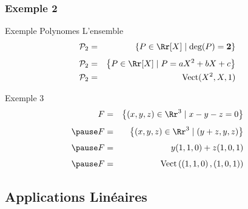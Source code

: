 \documentclass[dvipsnames]{beamer}
\begin{document}
\begin{frame}[<+->]
  \frametitle{Exemple 2}
  \begin{block}{Exemple Polynomes}
    \small
  L'ensemble 
  \begin{eqnarray*}
    \mathcal{P}_2 &=& \left\{ P \in \Rr[X]\;|\; \text{deg}(P) = \mathbf{2}
    \right\}\\[4pt]
    \mathcal{P}_2 &=& \left\{P \in \Rr[X]\;|\; P= aX^2 + bX + c\right\}\\
    \mathcal{P}_2 &=& \text{Vect}(X^2, X, 1)
\end{eqnarray*}
 \end{block} 
 \begin{block}{Exemple 3}
   \small
  \begin{eqnarray*}
    F &=& \left\{ (x,y,z) \in \Rr^3\;|\; x - y -z = 0 \right\}\\[4pt]\pause
    F &=& \left\{ (x,y,z) \in \Rr^3\;|\; (y+z, y, z) \right\}\\[4pt]\pause
    F &=& y(1,1,0) + z(1,0,1)\\[4pt]\pause
    F &=& \text{Vect}\left(\left(1,1,0\right), \left(1,0,1\right)\right)
  \end{eqnarray*} 
 \end{block}
\end{frame}
\subsection{Applications Linéaires}%
\label{sub:applications_linéaires}
\end{document}
